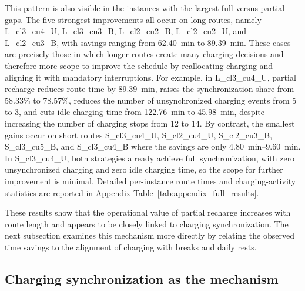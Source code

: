 \documentclass[3p,11pt,authoryear]{elsarticle}  %
\begin{document}
This pattern is also visible in the instances with the largest full-versus-partial gaps. The five strongest improvements all occur on long routes, namely L\_cl3\_cu4\_U, L\_cl3\_cu3\_B, L\_cl2\_cu2\_B, L\_cl2\_cu2\_U, and L\_cl2\_cu3\_B, with savings ranging from \SI{62.40}{min} to \SI{89.39}{min}. These cases are precisely those in which longer routes create many charging decisions and therefore more scope to improve the schedule by reallocating charging and aligning it with mandatory interruptions. For example, in L\_cl3\_cu4\_U, partial recharge reduces route time by \SI{89.39}{min}, raises the synchronization share from 58.33\% to 78.57\%, reduces the number of unsynchronized charging events from 5 to 3, and cuts idle charging time from \SI{122.76}{min} to \SI{45.98}{min}, despite increasing the number of charging stops from 12 to 14. By contrast, the smallest gains occur on short routes S\_cl3\_cu4\_U, S\_cl2\_cu4\_U, S\_cl2\_cu3\_B, S\_cl3\_cu5\_B, and S\_cl3\_cu4\_B where the savings are only \SIrange{4.80}{9.60}{min}. In S\_cl3\_cu4\_U, both strategies already achieve full synchronization, with zero unsynchronized charging and zero idle charging time, so the scope for further improvement is minimal. Detailed per-instance route times and charging-activity statistics are reported in Appendix Table~\ref{tab:appendix_full_results}.

These results show that the operational value of partial recharge increases with route length and appears to be closely linked to charging synchronization. The next subsection examines this mechanism more directly by relating the observed time savings to the alignment of charging with breaks and daily rests.


\subsection{Charging synchronization as the mechanism}
\end{document}
